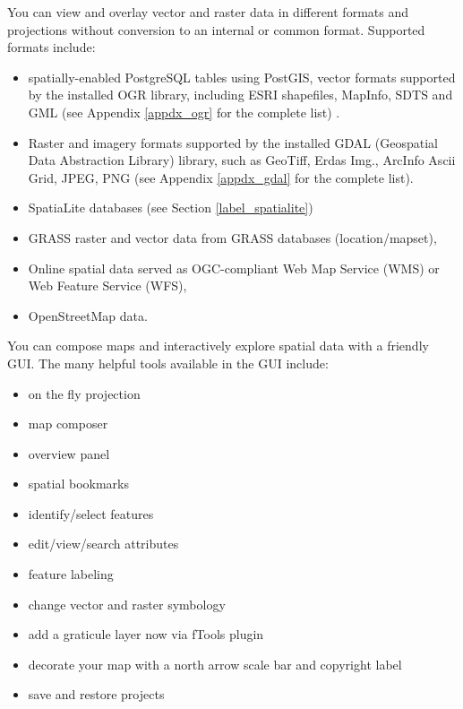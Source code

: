 
You can view and overlay vector and raster data in different formats and
projections without conversion to an internal or common format. Supported
formats include:

\begin{itemize}[label=--]
\item spatially-enabled PostgreSQL tables using PostGIS, vector 
formats
 supported by the installed OGR library, including ESRI shapefiles, MapInfo, 
SDTS and GML (see Appendix \ref{appdx_ogr} for the complete list) .
\item Raster and imagery formats supported by the installed GDAL (Geospatial
Data Abstraction Library) library, such as GeoTiff, Erdas Img., ArcInfo Ascii 
Grid, JPEG, PNG (see Appendix \ref{appdx_gdal} for the complete list).
\item SpatiaLite databases (see Section \ref{label_spatialite}) 
\item GRASS raster and vector data from GRASS databases (location/mapset), 
\item Online spatial data served as OGC-compliant Web Map Service (WMS) or
Web Feature Service (WFS),
\item OpenStreetMap data.
\end{itemize}


You can compose maps and interactively explore spatial data with a friendly
GUI. The many helpful tools available in the GUI include:

\begin{itemize}[label=--]
\item on the fly projection
\item map composer
\item overview panel
\item spatial bookmarks
\item identify/select features
\item edit/view/search attributes
\item feature labeling
\item change vector and raster symbology
\item add a graticule layer now via fTools plugin
\item decorate your map with a north arrow scale bar and copyright label
\item save and restore projects
\end{itemize}

